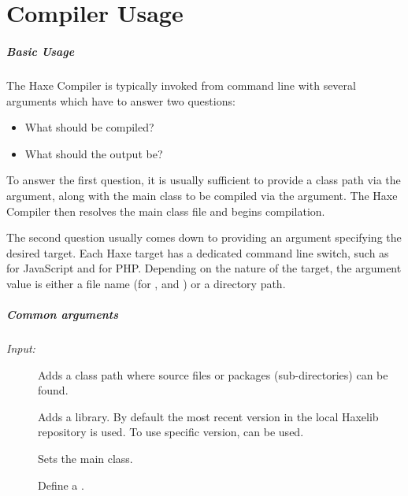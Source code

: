 \chapter{Compiler Usage}
\label{compiler-usage}

\paragraph{Basic Usage}

The Haxe Compiler is typically invoked from command line with several arguments which have to answer two questions:

\begin{itemize}
	\item What should be compiled?
	\item What should the output be?
\end{itemize}
	
To answer the first question, it is usually sufficient to provide a class path via the  argument, along with the main class to be compiled via the  argument. The Haxe Compiler then resolves the main class file and begins compilation.

The second question usually comes down to providing an argument specifying the desired target. Each Haxe target has a dedicated command line switch, such as  for JavaScript and  for PHP. Depending on the nature of the target, the argument value is either a file name (for ,  and ) or a directory path.

\paragraph{Common arguments}

\emph{Input:}

\begin{description}
	\item[] Adds a class path where  source files or packages (sub-directories) can be found.
	\item[] Adds a  library. By default the most recent version in the local Haxelib repository is used. To use specific version,  can be used.
	\item[] Sets the main class.
	\item[] Define a .
\end{description}

